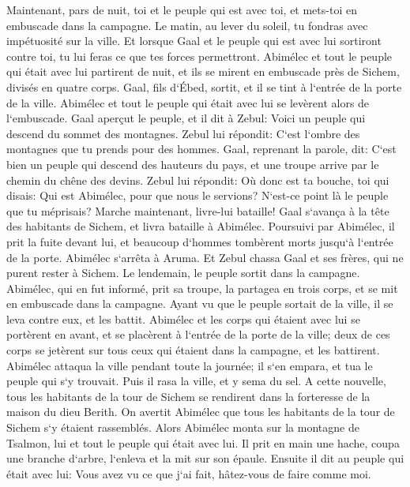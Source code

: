 \verse Maintenant, pars de nuit, toi et le peuple qui est avec toi, et mets-toi en embuscade dans la campagne. 
\verse Le matin, au lever du soleil, tu fondras avec impétuosité sur la ville. Et lorsque Gaal et le peuple qui est avec lui sortiront contre toi, tu lui feras ce que tes forces permettront. 
\verse Abimélec et tout le peuple qui était avec lui partirent de nuit, et ils se mirent en embuscade près de Sichem, divisés en quatre corps. 
\verse Gaal, fils d`Ébed, sortit, et il se tint à l`entrée de la porte de la ville. Abimélec et tout le peuple qui était avec lui se levèrent alors de l`embuscade. 
\verse Gaal aperçut le peuple, et il dit à Zebul: Voici un peuple qui descend du sommet des montagnes. Zebul lui répondit: C`est l`ombre des montagnes que tu prends pour des hommes. 
\verse Gaal, reprenant la parole, dit: C`est bien un peuple qui descend des hauteurs du pays, et une troupe arrive par le chemin du chêne des devins. 
\verse Zebul lui répondit: Où donc est ta bouche, toi qui disais: Qui est Abimélec, pour que nous le servions? N`est-ce point là le peuple que tu méprisais? Marche maintenant, livre-lui bataille! 
\verse Gaal s`avança à la tête des habitants de Sichem, et livra bataille à Abimélec. 
\verse Poursuivi par Abimélec, il prit la fuite devant lui, et beaucoup d`hommes tombèrent morts jusqu`à l`entrée de la porte. 
\verse Abimélec s`arrêta à Aruma. Et Zebul chassa Gaal et ses frères, qui ne purent rester à Sichem. 
\verse Le lendemain, le peuple sortit dans la campagne. Abimélec, qui en fut informé, 
\verse prit sa troupe, la partagea en trois corps, et se mit en embuscade dans la campagne. Ayant vu que le peuple sortait de la ville, il se leva contre eux, et les battit. 
\verse Abimélec et les corps qui étaient avec lui se portèrent en avant, et se placèrent à l`entrée de la porte de la ville; deux de ces corps se jetèrent sur tous ceux qui étaient dans la campagne, et les battirent. 
\verse Abimélec attaqua la ville pendant toute la journée; il s`en empara, et tua le peuple qui s`y trouvait. Puis il rasa la ville, et y sema du sel. 
\verse A cette nouvelle, tous les habitants de la tour de Sichem se rendirent dans la forteresse de la maison du dieu Berith. 
\verse On avertit Abimélec que tous les habitants de la tour de Sichem s`y étaient rassemblés. 
\verse Alors Abimélec monta sur la montagne de Tsalmon, lui et tout le peuple qui était avec lui. Il prit en main une hache, coupa une branche d`arbre, l`enleva et la mit sur son épaule. Ensuite il dit au peuple qui était avec lui: Vous avez vu ce que j`ai fait, hâtez-vous de faire comme moi. 

